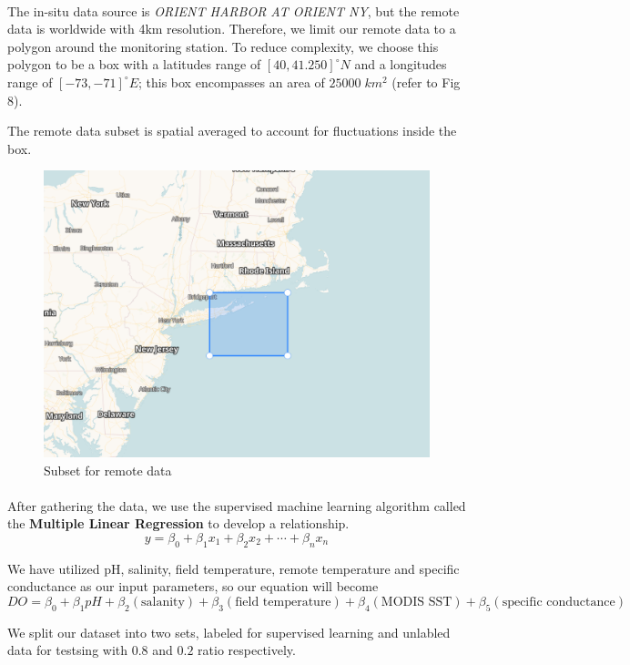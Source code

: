 \paragraph{}
    The in-situ data source is \textit{ORIENT HARBOR AT ORIENT NY}, but the remote data is worldwide with 4km resolution. Therefore, we limit our remote data to a polygon around the monitoring station.
    To reduce complexity, we choose this polygon to be a box with a latitudes range of $[40, 41.250] ^\circ N$ and a longitudes range of $[-73, -71]^\circ E$; this box encompasses an area of $25000\;km^2$ (refer to Fig 8).

    The remote data subset is spatial averaged to account for fluctuations inside the box.

\begin{figure}[H]
    \centering
    \includegraphics[scale=0.5]{figs/RSS_BOX.png}
    \caption{Subset for remote data}
\end{figure}


\paragraph*{}
    After gathering the data, we use the supervised machine learning algorithm called the \textbf{Multiple Linear Regression} to develop a relationship.
    \begin{equation}
        y = \beta_0 + \beta_1 x_1 + \beta_2 x_2 + \cdots + \beta_n x_n
    \end{equation}

    We have utilized pH, salinity, field temperature, remote temperature and specific conductance as our input parameters, so our equation will become
    \begin{equation}
        DO = \beta_0 + \beta_1 pH + \beta_2 (\text{salanity}) + \beta_3 (\text{field temperature}) + \beta_4 (\text{MODIS SST}) + \beta_5 (\text{specific conductance})
    \end{equation}

    We split our dataset into two sets, labeled for supervised learning and unlabled data for testsing with $0.8$ and $0.2$ ratio respectively.